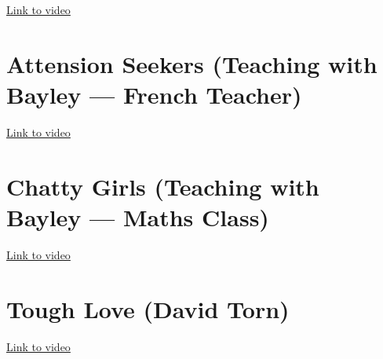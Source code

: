 \documentclass[12pt]{report}
\begin{document}
\href{https://www.youtube.com/watch?v=zr2xdjQPH4I (Links to an external site.)Links to an external site.}{Link to video}




% 





\section{Attension Seekers (Teaching with Bayley --- French Teacher)}

\href{https://www.youtube.com/watch?v=pXhtwDK4oHw}{Link to video}





% 
% 
% 
% 
% 




\section{Chatty Girls (Teaching with Bayley --- Maths Class)}

\href{https://www.youtube.com/watch?v=Q3OxKAxpOdo}{Link to video}





\section{Tough Love (David Torn)}

\href{https://www.youtube.com/watch?v=ec0v4kzYkCY}{Link to video}
\end{document}
